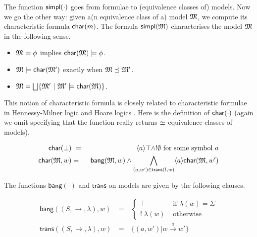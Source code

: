 The function $\mathsf{simpl}(\cdot)$ goes from formulae to (equivalence
classes of) models. Now we go the other way: given a(n equivalence class of a) model $\frak{M}$, we
compute its characteristic formula $\mathsf{char}(m)$. The formula
$\mathsf{simpl}(\frak{M})$ characterises the model $\frak{M}$ in the following
sense. 

\begin{itemize}

\item  $\frak{M} \models \phi$ implies $\mathsf{char}(\frak{M}) \models \phi$.

\item  $\frak{M} \models \mathsf{char}( \frak{M}' )$ exactly when $\frak{M} \preceq \frak{M}'$.

\item $\frak{M} = \bigsqcup \{\frak{M}' \ |\ \frak{M}' \models \mathsf{char}(\frak{M}) \}$.

\end{itemize}


\NI This notion of characteristic formula is closely related to
characteristic formulae in Hennessy-Milner logic
\cite{AcetoL:chaforfata} and Hoare logics
\cite{HondaK:descriptive,ChargueraudA:provertcf}. Here is the
definition of $\mathsf{char}(\cdot)$ (again we omit specifying that the function really
returns $\simeq$-equivalence classes of models).

\begin{eqnarray*}
  \mathsf{char}(\bot) &\ =\ & \langle a \rangle \top \land ! \emptyset  \mbox{ for some symbol }a  \\
  \mathsf{char}(\frak{M}, w) & = & \mathsf{bang}(\frak{M},w) \land \bigwedge_{(a,w') \in \mathsf{trans}(l,w)} \langle a \rangle \mathsf{char}(\frak{M}, w')  
\end{eqnarray*}


\NI The functions $\mathsf{bang}(\cdot)$ and $\mathsf{trans}$ on
models are given by the following clauses.

\begin{eqnarray*}
  \mathsf{bang}((S,\rightarrow,\lambda),w) 
     & \ = \ & 
  \begin{cases}
    \top & \mbox{ if } \lambda(w) = \Sigma  \\
    ! \; \lambda(w) & \mbox{ otherwise }  
  \end{cases} \\
  \mathsf{trans}((S,\rightarrow, \lambda),w) & \ = \ & \{(a,w') | w \xrightarrow{a} w' \} 
\end{eqnarray*}

